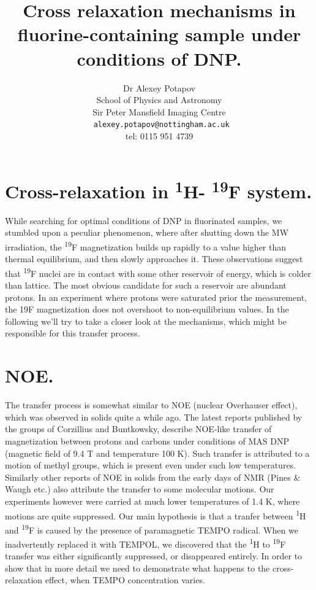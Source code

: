 \documentclass[a4paper, 12pt]{article}
\begin{document}
\title{Cross relaxation mechanisms in fluorine-containing sample under conditions of DNP.}
\author{Dr Alexey Potapov\\
School of Physics and Astronomy\\
Sir Peter Mansfield Imaging Centre \\
\texttt{ alexey.potapov@nottingham.ac.uk}\\
tel: 0115 951 4739 }
\maketitle
 
\doublespacing
 
\section{Cross-relaxation in \textsuperscript{1}H- \textsuperscript{19}F system.}
While searching for optimal conditions of DNP in fluorinated samples, we stumbled upon a peculiar phenomenon, where after shutting down the MW irradiation, the \textsuperscript{19}F magnetization builds up rapidly to a value higher than thermal equilibrium, and then slowly approaches it. These observations suggest that \textsuperscript{19}F nuclei are in contact with some other reservoir of energy, which is colder than lattice. The most obvious candidate for such a reservoir are abundant protons. In an experiment where protons were saturated prior the measurement, the 19F magnetization does not overshoot to non-equilibrium values. In the following we'll try to take a closer look at the mechanisms, which might be responsible for this transfer process.
\section{NOE.}
The transfer process is somewhat similar to NOE (nuclear Overhauser effect), which was observed in solids quite a while ago. The latest reports published by the groups of Corzillius and Buntkowsky, describe NOE-like transfer of magnetization between protons and carbons under conditions of MAS DNP (magnetic field of 9.4 T and temperature 100 K). Such transfer is attributed to a motion of methyl groups, which is present even under such low temperatures. Similarly other reports of NOE in solids from the early days of NMR (Pines \& Waugh etc.) also attribute the transfer to some molecular motions. Our experiments however were carried at much lower temperatures of 1.4 K, where motions are quite suppressed. 
Our main hypothesis is that a tranfer between \textsuperscript{1}H and \textsuperscript{19}F  is caused by the presence of paramagnetic TEMPO radical. When we inadvertently replaced it with TEMPOL, we discovered that the \textsuperscript{1}H to \textsuperscript{19}F transfer was either significantly suppressed, or disappeared entirely. In order to show that in more detail we need to demonstrate what happens to the cross-relaxation effect, when TEMPO concentration varies.
\end{document}
